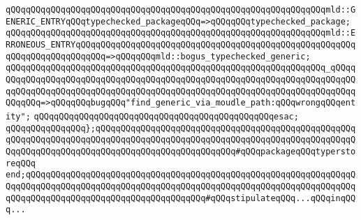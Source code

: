 \verb|qQQqqQQqqQQqqQQqqQQqqQQqqQQqqQQqqQQqqQQqqQQqqQQqqQQqqQQqqQQqqQQqmld::GENERIC_ENTRYqQQqtypechecked_packageqQQq=>qQQqqQQqtypechecked_package;|\newline
\verb|qQQqqQQqqQQqqQQqqQQqqQQqqQQqqQQqqQQqqQQqqQQqqQQqqQQqqQQqqQQqqQQqmld::ERRONEOUS_ENTRYqQQqqQQqqQQqqQQqqQQqqQQqqQQqqQQqqQQqqQQqqQQqqQQqqQQqqQQqqQQqqQQqqQQqqQQqqQQq=>qQQqqQQqmld::bogus_typechecked_generic;|\newline
\verb|qQQqqQQqqQQqqQQqqQQqqQQqqQQqqQQqqQQqqQQqqQQqqQQqqQQqqQQqqQQqqQQq_qQQqqQQqqQQqqQQqqQQqqQQqqQQqqQQqqQQqqQQqqQQqqQQqqQQqqQQqqQQqqQQqqQQqqQQqqQQqqQQqqQQqqQQqqQQqqQQqqQQqqQQqqQQqqQQqqQQqqQQqqQQqqQQqqQQqqQQqqQQqqQQqqQQqqQQq=>qQQqqQQqbugqQQq"find_generic_via_moudle_path:qQQqwrongqQQqentity";|\newline
\verb|qQQqqQQqqQQqqQQqqQQqqQQqqQQqqQQqqQQqqQQqqQQqqQQqesac;|\newline
\newline
\newline
\verb|qQQqqQQqqQQqqQQq};qQQqqQQqqQQqqQQqqQQqqQQqqQQqqQQqqQQqqQQqqQQqqQQqqQQqqQQqqQQqqQQqqQQqqQQqqQQqqQQqqQQqqQQqqQQqqQQqqQQqqQQqqQQqqQQqqQQqqQQqqQQqqQQqqQQqqQQqqQQqqQQqqQQqqQQqqQQqqQQqqQQqqQQq#qQQqpackageqQQqtyperstoreqQQq|\newline
\verb|end;qQQqqQQqqQQqqQQqqQQqqQQqqQQqqQQqqQQqqQQqqQQqqQQqqQQqqQQqqQQqqQQqqQQqqQQqqQQqqQQqqQQqqQQqqQQqqQQqqQQqqQQqqQQqqQQqqQQqqQQqqQQqqQQqqQQqqQQqqQQqqQQqqQQqqQQqqQQqqQQqqQQqqQQqqQQqqQQq#qQQqstipulateqQQq...qQQqinqQQq...|\newline
\newline
\newline

